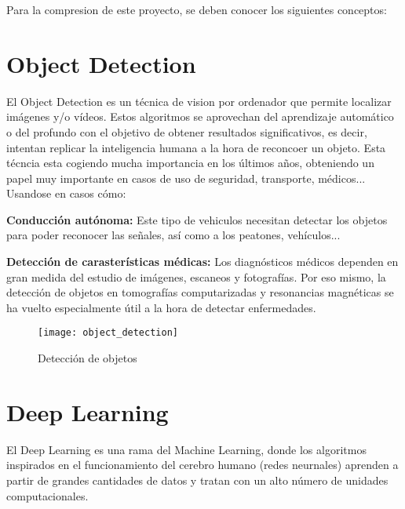 
Para la compresion de este proyecto, se deben conocer los siguientes conceptos:

\section{Object Detection}

El Object Detection \cite{objectDetect} es un técnica de vision por ordenador que permite localizar imágenes y/o vídeos. Estos algoritmos se aprovechan del aprendizaje automático o del profundo 
con el objetivo de obtener resultados significativos, es decir, intentan replicar la inteligencia humana a la hora de reconcoer un objeto.
Esta técncia esta cogiendo mucha importancia en los últimos años, obteniendo un papel muy importante en casos de uso de seguridad, transporte, médicos...\\
Usandose en casos cómo:
\begin{list}{\textbullet}{ %
    \addtolength{\itemsep}{-2mm} %
    \setlength{\itemindent}{2mm}}
    \item \textbf{Conducción autónoma:} Este tipo de vehiculos necesitan detectar los objetos para poder reconocer las señales, así como a los peatones, vehículos...
    \item \textbf{Detección de carasterísticas médicas:} Los diagnósticos médicos dependen en gran medida del estudio de imágenes, escaneos y fotografías. Por eso mismo, la detección de objetos en tomografías computarizadas y resonancias magnéticas se ha vuelto especialmente útil a la hora de detectar enfermedades. 
\end{list}

\begin{figure}[!h]
		\centering
		\texttt{[image: object\_detection]}
		\caption{Detección de objetos \cite{imgOD}}\label{fig:object_detection}
\end{figure}

\section{Deep Learning} 

El Deep Learning \cite{deepLearning} es una rama del Machine Learning, donde los algoritmos inspirados en el funcionamiento del cerebro humano (redes neurnales) aprenden a partir de 
grandes cantidades de datos y tratan con un alto número de unidades computacionales.

